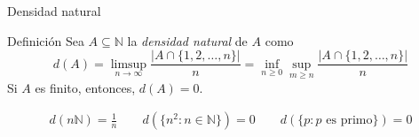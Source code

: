 \begin{frame}{Densidad natural}
    \begin{block}{Definición}
        Sea $A\subseteq\mathbb{N}$ la \textit{densidad natural} de $A$ como $$d(A)=\limsup_{n\to\infty}{\frac{\left|A\cap\{1,2,\dots,n\}\right|}{n}}=\inf_{n\geq 0}\sup_{m\geq n}{\frac{\left|A\cap\{1,2,\dots,n\}\right|}{n}}$$
        Si $A$ es finito, entonces, $d(A)=0$.
    \end{block}

    \begin{center}
        \begin{align*}
        d(n\mathbb{N})=\frac{1}{n} \qquad
        d(\{n^{2}:n\in\mathbb{N}\})=0 \qquad
        d(\{p:p\text{ es primo}\}) = 0
        \end{align*}
    \end{center}
    
\end{frame}

